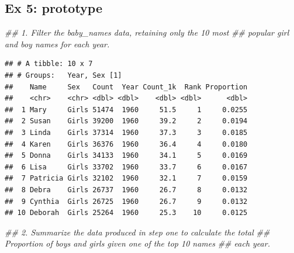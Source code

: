 \documentclass[]{book}
\newenvironment{Shaded}{\begin{snugshade}}{\end{snugshade}}
\newcommand{\CommentTok}[1]{\textcolor[rgb]{0.56,0.35,0.01}{\textit{#1}}}
\newcommand{\DataTypeTok}[1]{\textcolor[rgb]{0.13,0.29,0.53}{#1}}
\newcommand{\DecValTok}[1]{\textcolor[rgb]{0.00,0.00,0.81}{#1}}
\newcommand{\KeywordTok}[1]{\textcolor[rgb]{0.13,0.29,0.53}{\textbf{#1}}}
\newcommand{\NormalTok}[1]{#1}
\newcommand{\OperatorTok}[1]{\textcolor[rgb]{0.81,0.36,0.00}{\textbf{#1}}}
\newcommand{\StringTok}[1]{\textcolor[rgb]{0.31,0.60,0.02}{#1}}
\begin{document}
\hypertarget{ex-5-prototype}{%
\subsection{Ex 5: prototype}\label{ex-5-prototype}}

\begin{Shaded}
\begin{Highlighting}[]
\CommentTok{## 1.  Filter the baby_names data, retaining only the 10 most }
\CommentTok{##     popular girl and boy names for each year.}
\end{Highlighting}
\end{Shaded}

\begin{Shaded}
\end{Shaded}

\begin{verbatim}
## # A tibble: 10 x 7
## # Groups:   Year, Sex [1]
##    Name     Sex   Count  Year Count_1k  Rank Proportion
##    <chr>    <chr> <dbl> <dbl>    <dbl> <dbl>      <dbl>
##  1 Mary     Girls 51474  1960     51.5     1     0.0255
##  2 Susan    Girls 39200  1960     39.2     2     0.0194
##  3 Linda    Girls 37314  1960     37.3     3     0.0185
##  4 Karen    Girls 36376  1960     36.4     4     0.0180
##  5 Donna    Girls 34133  1960     34.1     5     0.0169
##  6 Lisa     Girls 33702  1960     33.7     6     0.0167
##  7 Patricia Girls 32102  1960     32.1     7     0.0159
##  8 Debra    Girls 26737  1960     26.7     8     0.0132
##  9 Cynthia  Girls 26725  1960     26.7     9     0.0132
## 10 Deborah  Girls 25264  1960     25.3    10     0.0125
\end{verbatim}

\begin{Shaded}
\begin{Highlighting}[]
\CommentTok{## 2.  Summarize the data produced in step one to calculate the total}
\CommentTok{##     Proportion of boys and girls given one of the top 10 names}
\CommentTok{##     each year.}
\end{Highlighting}
\end{Shaded}
\end{document}
